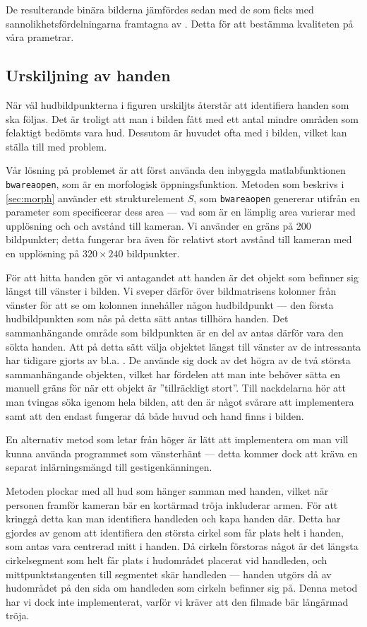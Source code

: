 De resulterande binära bilderna jämfördes sedan med de som ficks med
sannolikhetsfördelningarna framtagna av . Detta
för att bestämma kvaliteten på våra prametrar.

\subsection{Urskiljning av handen}\label{sec:metod_hud:urskiljning}
När väl hudbildpunkterna i figuren urskiljts återstår att 
identifiera handen som ska följas. Det är troligt att man i bilden
fått med ett antal mindre områden som felaktigt bedömts vara
hud. Dessutom är huvudet ofta med i bilden, vilket kan ställa till med
problem. 

Vår lösning på problemet är att först använda den inbyggda
matlabfunktionen \texttt{bwareaopen}, som är en morfologisk
öppningsfunktion. Metoden som beskrivs i
\ref{sec:morph} använder ett strukturelement $S$, som \texttt{bwareaopen}
genererar utifrån en parameter som specificerar
dess area --- vad som är en lämplig area
varierar med upplösning och
och avstånd till kameran. Vi använder en gräns på 200
bildpunkter; detta fungerar bra även för relativt stort avstånd till
kameran med en upplösning på $320\times240$ bildpunkter.

För att hitta handen gör vi antagandet att handen är det
objekt som befinner sig längst till vänster i bilden.
Vi sveper därför över bildmatrisens kolonner från
vänster för att se om kolonnen innehåller någon hudbildpunkt --- den första
hudbildpunkten som nås på detta sätt antas tillhöra handen.
Det sammanhängande område som bildpunkten är en del av antas därför vara
den sökta handen.
Att på detta sätt välja objektet längst till vänster av de
intressanta har tidigare gjorts av bl.a. . De använde
sig dock av det högra av de två största sammanhängande objekten,
vilket har fördelen att man inte behöver sätta en manuell gräns för
när ett objekt är ''tillräckligt stort''. Till nackdelarna hör
att man tvingas
söka igenom hela bilden, att den är något svårare att
implementera samt att den endast fungerar då både huvud och hand finns
i bilden.

En alternativ metod som letar från
höger är lätt att implementera om man vill kunna använda programmet
som vänsterhänt --- detta kommer dock att kräva en
separat inlärningsmängd till gestigenkänningen. 

Metoden plockar med all hud som hänger samman med
handen, vilket när personen framför kameran bär en kortärmad tröja inkluderar
armen. För att
kringgå detta kan man identifiera handleden och kapa handen
där. Detta har gjordes av  genom att identifiera den 
största cirkel
som får plats helt i handen, som antas vara centrerad mitt i handen. Då
cirkeln förstoras något är det längsta cirkelsegment som helt får
plats i hudområdet placerat vid handleden, och mittpunktstangenten
till segmentet skär handleden --- handen utgörs då av hudområdet på den
sida om handleden som cirkeln befinner sig på. Denna metod har vi dock
inte implementerat, varför vi kräver att den filmade bär
långärmad tröja. 
